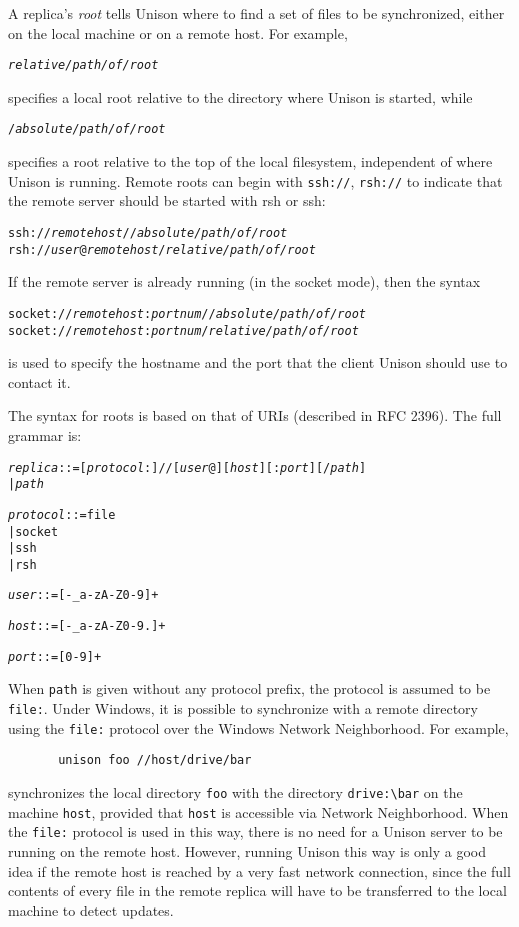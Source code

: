 \documentclass{article}
\newcommand{\NT}[1]{\textit{#1}}
\begin{document}
A replica's {\em root} tells Unison where to find a set of files to be
synchronized, either on the local machine or on a remote host.
For example,
\begin{alltt}
      \NT{relative/path/of/root}
\end{alltt}
\noindent
specifies a local root relative to the directory where Unison is
started, while
\begin{alltt}
      /\NT{absolute/path/of/root}
\end{alltt}
\noindent
specifies a root relative to the top of the local filesystem,
independent of where Unison is running.  Remote roots can begin with
\verb|ssh://|,
\verb|rsh://|
to indicate that the remote server should be started with rsh or ssh:
\begin{alltt}
      ssh://\NT{remotehost}//\NT{absolute/path/of/root}
      rsh://\NT{user}@\NT{remotehost}/\NT{relative/path/of/root}
\end{alltt}
If the remote server is already running (in the socket mode), then the syntax
\begin{alltt}
      socket://\NT{remotehost}:\NT{portnum}//\NT{absolute/path/of/root}
      socket://\NT{remotehost}:\NT{portnum}/\NT{relative/path/of/root}
\end{alltt}
\noindent
is used to specify the hostname and the port that the client Unison should
use to contact it.

The syntax for roots is based on that of URIs (described in RFC 2396).
The full grammar is: 
\begin{alltt}
  \NT{replica} ::= [\NT{protocol}:]//[\NT{user}@][\NT{host}][:\NT{port}][/\NT{path}]
           |  \NT{path}

  \NT{protocol} ::= file
            |  socket
            |  ssh
            |  rsh

  \NT{user} ::= [-_a-zA-Z0-9]+

  \NT{host} ::= [-_a-zA-Z0-9.]+

  \NT{port} ::= [0-9]+
\end{alltt}
When \verb|path| is given without any protocol prefix, the protocol is
assumed to be \verb|file:|.  Under Windows, it is possible to
synchronize with a remote directory using the \verb|file:| protocol over
the Windows Network Neighborhood.  For example,
\begin{verbatim}
       unison foo //host/drive/bar
\end{verbatim}
\noindent
synchronizes the local directory \verb|foo| with the directory
\verb|drive:\bar| on the machine \verb|host|, provided that \verb|host|
is accessible via Network Neighborhood.  When the \verb|file:| protocol
is used in this way, there is no need for a Unison server to be running
on the remote host.  However, running Unison this way is only a good
idea if the remote host is reached by a very fast network connection,
since the full contents of every file in the remote replica will have to
be transferred to the local machine to detect updates.
\end{document}
